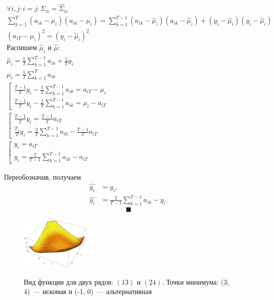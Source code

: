 \documentclass{article}
\begin{document}
\begin{gather*}
	\forall i, j: i = j: \Sigma_{ii} = \hat{\Sigma}_{ii}\\
	\sum_{k=1}^{T}(a_{ik} - \mu_i)(a_{ik}-\mu_i) = \sum_{k=1}^{T-1}(a_{ik} - \hat{\mu}_i)(a_{ik}-\hat{\mu}_i) + (y_i - \hat{\mu}_i)(y_i - \hat{\mu}_i)\\
	(a_{iT}-\mu_i)^2 = (y_i-\hat{\mu}_i)^2\\
	\text{Распишем } \hat{\mu}_i \text{ и } \hat{\mu}:\\
	\hat{\mu}_i = \frac{1}{T}\sum_{k=1}^{T-1}a_{ik} + \frac{1}{T}y_i\\
	\mu_i = \frac{1}{T}\sum_{k=1}^{T}a_{ik}\\
	\left[
	\begin{array}{ll}
		\frac{T-1}{T}y_i-\frac{1}{T}\sum_{k=1}^{T-1}a_{ik}=a_{iT}-\mu_i
		\\[1ex]
		\frac{T-1}{T}y_i-\frac{1}{T}\sum_{k=1}^{T-1}a_{ik}=\mu_i-a_{iT}
	\end{array}
	\right .\\[1ex]
	\left[
	\begin{array}{ll}
		\frac{T-1}{T}y_i = \frac{T-1}{T}a_{iT}
		\\[1ex]
		\frac{T_1}{T}y_i = \frac{2}{T} \sum_{k=1}^{T-1} a_{ik} - \frac{T-1}{T}a_{iT}
	\end{array}
	\right .\\[1ex]
	\left[
	\begin{array}{ll}
		y_i = a_{iT}
		\\[1ex]
		y_i = \frac{2}{T-1} \sum_{k=1}^{T-1} a_{ik} - a_{iT}
	\end{array}
	\right .
\end{gather*}

Переобозначив, получаем
\begin{align*}
	\hat{y_i} &= y_i,\\
	\hat{y_i} &= \frac{2}{T-1} \sum_{k=1}^{T-1} a_{ik} - y_i.
\end{align*}
$$ \blacksquare $$

\begin{figure}
	\centering
	\begin{center}
		\includegraphics[width=0.3\textwidth]{CorrelationError}
		\label{fig:fig5}
	\end{center}
	\caption{Вид функции для двух рядов: $(1 3)$ и $(2 4)$. Точки минимума: (3; 4)~--- искомая и (-1, 0)~--- альтернативная}
\end{figure}
\end{document}
